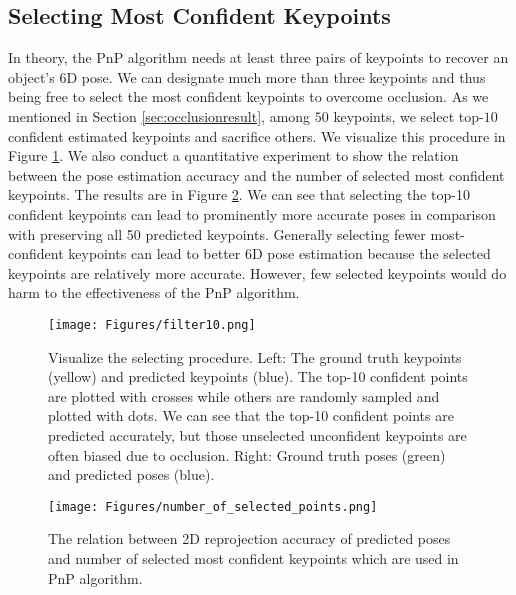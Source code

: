 \documentclass[10pt,twocolumn,letterpaper]{article}
\begin{document}
\subsection{Selecting Most Confident Keypoints}
\label{sec:choosing_most_conf}
In theory, the PnP algorithm needs at least three pairs of keypoints to recover an object's 6D pose. We can designate much more than three keypoints and thus being free to select the most confident keypoints to overcome occlusion. As we mentioned in Section \ref{sec:occlusionresult}, among $50$ keypoints, we select top-$10$ confident estimated keypoints and sacrifice others. We visualize this procedure in Figure \ref{fig:filter10}. We also conduct a quantitative experiment to show the relation between the pose estimation accuracy and the number of selected most confident keypoints. The results are in Figure \ref{fig:number_of_selected_keypoints}. We can see that selecting the top-10 confident keypoints can lead to prominently more accurate poses in comparison with preserving all 50 predicted keypoints. Generally selecting fewer most-confident keypoints can lead to better 6D pose estimation because the selected keypoints are relatively more accurate. However, few selected keypoints would do harm to the effectiveness of the PnP algorithm.
\begin{figure}[t]
\begin{center}
   \texttt{[image: Figures/filter10.png]}
\end{center}
   \caption{Visualize the selecting procedure. Left: The ground truth keypoints (yellow) and predicted keypoints (blue). The top-10 confident points are plotted with crosses while others are randomly sampled and plotted with dots. We can see that the top-10 confident points are predicted accurately, but those unselected unconfident keypoints are often biased due to occlusion. Right: Ground truth poses (green) and predicted poses (blue).}
\label{fig:filter10}
\end{figure}

\begin{figure}[t]
\begin{center}
   \texttt{[image: Figures/number\_of\_selected\_points.png]}
\end{center}
   \caption{The relation between 2D reprojection accuracy of predicted poses and number of selected most confident keypoints which are used in PnP algorithm.}
\label{fig:number_of_selected_keypoints}
\end{figure}
\end{document}
